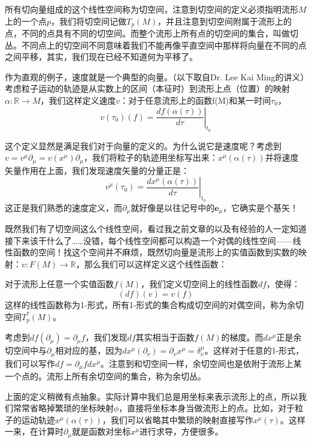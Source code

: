 \documentclass{ctexart}
\begin{document}
所有切向量组成的这个线性空间称为切空间，注意到切空间的定义必须指明流形$M$上的一个点$p$，我们将切空间记做$T_p(M)$，并且注意到切空间附属于流形上的点，不同的点具有不同的切空间。而整个流形上所有点的切空间的集合，叫做切丛。不同点上的切空间不同意味着我们不能再像平直空间中那样将向量在不同的点之间平移，其实，我们现在已经不知道何为平移了。

作为直观的例子，速度就是一个典型的向量。（以下取自Dr. Lee Kai Ming的讲义）考虑粒子运动的轨迹是从实数上的区间（本征时）到流形上点（位置）的映射$\alpha:\mathbb{R}\to M$，我们这样定义速度$v$：对于任意流形上的函数f(M)和某一时间$\tau_0$，
\begin{equation}
v(\tau_0)(f)=\left.\frac{df(\alpha(\tau))}{d\tau}\right|_{t_0}
\end{equation}

这个定义显然是满足我们对于向量的定义的。为什么说它是速度呢？考虑到$v=v^\mu\partial_\mu=v(x^\mu)\partial_\mu$，我们将粒子的轨迹用坐标写出来：$x^\mu(\alpha(\tau))$并将速度矢量作用在上面，我们发现速度矢量的分量正是：
\begin{equation}
v^\mu(\tau_0)=\left.\frac{dx^\mu(\alpha(\tau))}{d\tau}\right|_{t_0}
\end{equation}
这正是我们熟悉的速度定义，而$\partial_\mu$就好像是以往记号中的$\bm{e}_\mu$，它确实是个基矢！

既然我们有了切空间这么个线性空间，看过我之前文章的以及有经验的人一定知道接下来该干什么了……没错，每个线性空间都可以构造一个对偶的线性空间——线性函数的空间！找这个空间并不麻烦，既然切向量是流形上的实值函数到实数的映射：$v:F(M)\to\mathbb{R}$，那么我们可以这样定义这个线性函数：

对于流形上任意一个实值函数$f(M)$，我们定义切空间上的线性函数$df$，使得：
\begin{equation}
(df)(v)=v(f)
\end{equation}
这样的线性函数称为1-形式，所有1-形式的集合构成切空间的对偶空间，称为余切空间$T_p^*(M)$。

考虑到$df(\partial_\mu)=\partial_\mu f$，我们发现$df$其实相当于函数$f(M)$的梯度。而$dx^\mu$正是余切空间中与$\partial_\mu$相对应的基，因为$dx^\mu(\partial_\nu)=\partial_\nu x^\mu=\delta_\nu^\mu$。这样对于任意的1-形式，我们可以写作$df=\partial_\mu fdx^\mu$。注意到和切空间一样，余切空间也是依附于流形上某一个点的。流形上所有余切空间的集合，称为余切丛。

上面的定义稍微有点抽象。实际计算中我们总是用坐标来表示流形上的点，所以我们常常省略掉繁琐的坐标映射$\phi$，直接将坐标本身当做流形上的点。比如，对于粒子的运动轨迹$x^\mu(\alpha(\tau))$，我们可以省略其中繁琐的映射直接写作$x^\mu(\tau)$。这样一来，在计算时$\partial_\mu$就是函数对坐标$x^\mu$进行求导，方便很多。
\end{document}
